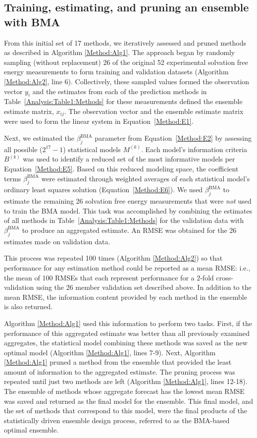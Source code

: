 \documentclass[journal=jpcbfk, manuscript=article]{achemso}
\newcommand{\+}[1]{\ensuremath{\mathbf{#1}}}
\begin{document}
 
 \subsection{Training, estimating, and pruning an ensemble with BMA} \label{EP:training}
From this initial set of 17 methods, we iteratively assessed and pruned methods as described in Algorithm \ref{Method:Alg1}.
The approach began by randomly sampling (without replacement) 26 of the original 52 experimental solvation free energy measurements to form training and validation datasets (Algorithm \ref{Method:Alg2}, line 6).
Collectively, these sampled values formed the observation vector $y_i$ and the estimates from each of the prediction methods in Table~\ref{Analysis:Table1:Methods} for these measurements defined the ensemble estimate matrix, $x_{i j}$.
The observation vector and the ensemble estimate matrix were used to form the linear system in Equation~\ref{Method:E1}.  

Next, we estimated the $\beta_j^{\text{BMA}}$ parameter from Equation~\ref{Method:E2} by assessing all possible ($2^{17} -1$) statistical models $M^{(k)}$.
Each model's information criteria $B^{(k)}$ was used to identify a reduced set of the most informative models per Equation~\ref{Method:E5}.
Based on this reduced modeling space, the coefficient terms $\beta_j^{\text{BMA}}$ were estimated through weighted averages of each statistical model's ordinary least squares solution (Equation~\ref{Method:E6}).
We used $\beta_j^{\text{BMA}}$ to estimate the remaining 26 solvation free energy measurements that were \emph{not} used to train the BMA model.
This task was accomplished by combining the estimates of all methods in Table~\ref{Analysis:Table1:Methods} for the validation data with $\beta_j^{\text{BMA}}$ to produce an aggregated estimate. 
An RMSE was obtained for the 26 estimates made on validation data.

This process was repeated 100 times (Algorithm \ref{Method:Alg2}) so that performance for any estimation method could be reported as a mean RMSE: i.e., the mean of 100 RMSEs that each represent performance for a 2-fold cross-validation using the 26 member validation set described above.
In addition to the mean RMSE, the information content provided by each method in the ensemble is also returned. 

Algorithm \ref{Method:Alg1} used this information to perform two tasks.
First, if the performance of this aggregated estimate was better than all previously examined aggregates, the statistical model combining these methods was saved as the new optimal model (Algorithm \ref{Method:Alg1}, lines 7-9).
Next, Algorithm \ref{Method:Alg1} pruned a method from the ensemble that provided the least amount of information to the aggregated estimate.
The pruning process was repeated until just two methods are left (Algorithm \ref{Method:Alg1}, lines 12-18).
The ensemble of methods whose aggregate forecast has the lowest mean RMSE was saved and returned as the final model for the ensemble.
This final model, and the set of methods that correspond to this model, were the final products of the statistically driven ensemble design process, referred to as the BMA-based optimal ensemble.
\end{document}

